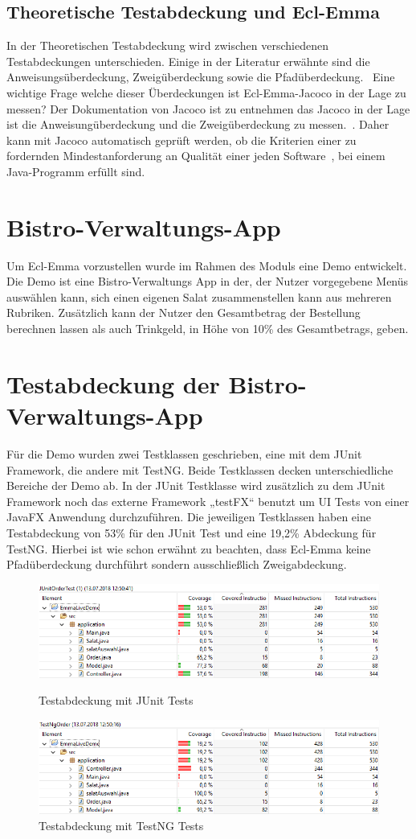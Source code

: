 \documentclass[a4paper]{article}
\begin{document}
\subsection{Theoretische Testabdeckung und Ecl-Emma}
In der Theoretischen Testabdeckung wird zwischen verschiedenen Testabdeckungen unterschieden. Einige in der Literatur erwähnte sind die Anweisungsüberdeckung, Zweigüberdeckung sowie die Pfadüberdeckung.~\cite{hoff}
Eine wichtige Frage welche dieser Überdeckungen ist Ecl-Emma-Jacoco  in der Lage zu messen? Der Dokumentation von Jacoco ist zu entnehmen das Jacoco in der Lage ist die Anweisungüberdeckung und die Zweigüberdeckung zu messen.~\cite{jacoco}. Daher kann mit Jacoco automatisch geprüft werden, ob die Kriterien einer zu fordernden Mindestanforderung an Qualität einer jeden Software~\cite{hoff}, bei einem Java-Programm erfüllt sind.
\section{Bistro-Verwaltungs-App}
Um Ecl-Emma vorzustellen wurde im Rahmen des Moduls eine Demo entwickelt. 
Die Demo ist eine Bistro-Verwaltungs App in der, der Nutzer vorgegebene Menüs auswählen kann, sich einen eigenen Salat zusammenstellen kann aus mehreren Rubriken. Zusätzlich kann der Nutzer den Gesamtbetrag der Bestellung berechnen lassen als auch Trinkgeld, in Höhe von 10\% des Gesamtbetrags, geben.
\section{Testabdeckung der Bistro-Verwaltungs-App}
Für die Demo wurden zwei Testklassen geschrieben, eine mit dem JUnit Framework, die andere mit TestNG. Beide Testklassen decken unterschiedliche Bereiche der Demo ab. 
In der JUnit Testklasse wird zusätzlich zu dem JUnit Framework noch das externe Framework „testFX“ benutzt um UI Tests von einer JavaFX Anwendung durchzuführen.
Die jeweiligen Testklassen haben eine Testabdeckung von 53\% für den JUnit Test und eine 19,2\% Abdeckung für TestNG. 
Hierbei ist wie schon erwähnt zu beachten, dass Ecl-Emma keine Pfadüberdeckung durchführt sondern ausschließlich Zweigabdeckung. 
\begin{figure}[h]
\includegraphics[scale=0.60 ]{Testabdeckung_JUnit.png}
\caption{Testabdeckung mit JUnit Tests}
\includegraphics[scale=0.60]{Testabdeckung_TestNG.png}
\caption{Testabdeckung mit TestNG Tests}
\centering
\end{figure}
\end{document}
